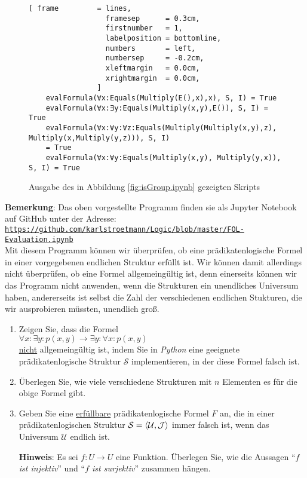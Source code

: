 \begin{figure}[!ht]
\centering
\begin{Verbatim}[ frame         = lines, 
                  framesep      = 0.3cm, 
                  firstnumber   = 1,
                  labelposition = bottomline,
                  numbers       = left,
                  numbersep     = -0.2cm,
                  xleftmargin   = 0.0cm,
                  xrightmargin  = 0.0cm,
                ]
    evalFormula(∀x:Equals(Multiply(E(),x),x), S, I) = True
    evalFormula(∀x:∃y:Equals(Multiply(x,y),E()), S, I) = True
    evalFormula(∀x:∀y:∀z:Equals(Multiply(Multiply(x,y),z), Multiply(x,Multiply(y,z))), S, I)
    = True
    evalFormula(∀x:∀y:Equals(Multiply(x,y), Multiply(y,x)), S, I) = True
\end{Verbatim}
\vspace*{-0.3cm}
\caption{Ausgabe des in Abbildung \ref{fig:isGroup.ipynb} gezeigten Skripts}
\label{fig:isGroup.out}
\end{figure}

\noindent
\textbf{Bemerkung}:  Das oben vorgestellte Programm finden sie als Jupyter Notebook auf GitHub unter der Adresse:
\\[0.2cm]
\hspace*{0.8cm}
\href{https://github.com/karlstroetmann/Logic/blob/master/Python/FOL-Evaluation.ipynb}{\texttt{https://github.com/karlstroetmann/Logic/blob/master/FOL-Evaluation.ipynb}}
\\[0.2cm]
Mit diesem Programm können wir überprüfen, ob eine
prädikatenlogische Formel in einer vorgegebenen endlichen Struktur erfüllt ist. Wir können damit
allerdings nicht überprüfen, ob eine Formel allgemeingültig ist, denn einerseits können
wir das Programm nicht anwenden, wenn die Strukturen ein unendliches Universum haben,
andererseits ist selbst die Zahl der verschiedenen endlichen Stukturen, die wir ausprobieren
müssten, unendlich groß.  \eox

\exercise
\begin{enumerate}
\item Zeigen Sie, dass die Formel
      \\[0.2cm]
      \hspace*{1.3cm}
      $\forall x: \exists y: p(x,y) \rightarrow \exists y: \forall x: p(x,y)$
      \\[0.2cm]
      \underline{nicht} allgemeingültig ist, indem Sie in \textsl{Python} eine geeignete
      prädikatenlogische Struktur $\mathcal{S}$ implementieren, in der diese Formel falsch ist.
\item Überlegen Sie, wie viele verschiedene Strukturen mit $n$ Elementen es für die obige Formel gibt.
\item Geben Sie eine \underline{erfüllbare} prädikatenlogische Formel $F$ an, die in einer prädikatenlogischen
      Struktur $\mathcal{S} = \pair(\mathcal{U},\mathcal{J})$ immer falsch ist, wenn das Universum $\mathcal{U}$ endlich ist.

      \textbf{Hinweis}: Es sei $f:U \rightarrow U$ eine Funktion.  Überlegen Sie, wie die Aussagen
      ``\emph{$f$ ist injektiv}'' und ``\emph{$f$ ist surjektiv}'' zusammen hängen.
      \exend  
\end{enumerate}

